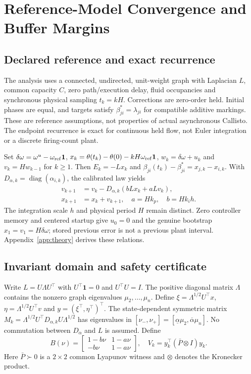 \section{Reference-Model Convergence and Buffer Margins}
\label{sec:btd_reference}

\subsection{Declared reference and exact recurrence}
The analysis uses a connected, undirected, unit-weight graph with
Laplacian $L$, common capacity $C$, zero path/execution delay, fluid
occupancies and synchronous physical sampling $t_k=kH$. Corrections
are zero-order held. Initial phases are equal, and targets satisfy
$\beta^*_{ji}=\lambda_{ji}$ for compatible additive markings. These
are reference assumptions, not properties of actual asynchronous
Callisto. The endpoint recurrence is exact for continuous held flow,
not Euler integration or a discrete firing-count plant.

Set $\delta\omega=\omega^u-\omega_{\rm ref}\mathbf1$,
$x_k=\theta(t_k)-\theta(0)-kH\omega_{\rm ref}\mathbf1$,
$w_k=\delta\omega+u_k$ and $v_k=Hw_{k-1}$ for $k\ge1$.
Then $E_k=-Lx_k$ and $\beta_{ji}(t_k)-\beta^*_{ji}=x_{j,k}-x_{i,k}$.
With $D_{\alpha,k}=\operatorname{diag}(\alpha_{i,k})$, the calibrated
law yields
\begin{align}
 v_{k+1}&=v_k-D_{\alpha,k}(bLx_k+aLv_k),\nonumber\\
 x_{k+1}&=x_k+v_{k+1},\quad a=Hk_p,\quad b=Hk_ih.
 \label{eq:btd_full_recurrence}
\end{align}
The integration scale $h$ and physical period $H$ remain distinct.
Zero controller memory and centered startup give $u_0=0$ and the
genuine bootstrap $x_1=v_1=H\delta\omega$; stored previous error is
not a previous plant interval. Appendix~\ref{app:theory} derives these relations.

\subsection{Invariant domain and safety certificate}
Write $L=U\Lambda U^\top$ with $U^\top\mathbf1=0$ and
$U^\top U=I$. The positive diagonal matrix $\Lambda$ contains
the nonzero graph eigenvalues $\mu_2,\ldots,\mu_n$.
Define $\xi=\Lambda^{1/2}U^\top x$, $\eta=\Lambda^{1/2}U^\top v$
and $y=(\xi^\top,\eta^\top)^\top$. The state-dependent symmetric
matrix $M_k=\Lambda^{1/2}U^\top D_{\alpha,k}U\Lambda^{1/2}$ has
eigenvalues in $[\nu_-,\nu_+]=[\underline\alpha\mu_2,
\overline\alpha\mu_n]$. No commutation between $D_\alpha$ and $L$
is assumed. Define
\begin{equation}
 B(\nu)=\begin{bmatrix}1-b\nu&1-a\nu\\-b\nu&1-a\nu\end{bmatrix},
 \quad V_k=y_k^\top(\bar P\otimes I)y_k.
\end{equation}
Here $\bar P\succ0$ is a $2\times2$ common Lyapunov witness and
$\otimes$ denotes the Kronecker product.

